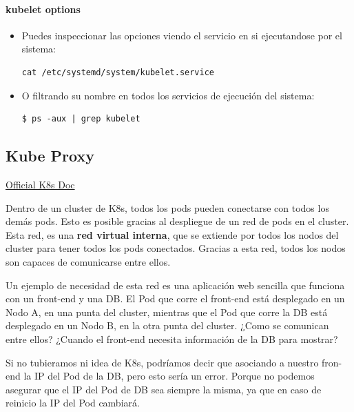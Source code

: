 \documentclass{article}
\newenvironment{codetemplate}[1][]{%
  \mybasecolorbox[#1]
  \itshape
}{%
  \endmybasecolorbox
}
\begin{document}
\paragraph{kubelet options}

\begin{itemize}
    \item Puedes inspeccionar las opciones viendo el servicio en si ejecutandose por el sistema:
\begin{codetemplate}{}
\begin{verbatim}
cat /etc/systemd/system/kubelet.service
\end{verbatim}
\end{codetemplate}

    \item O filtrando su nombre en todos los servicios de ejecución del sistema:
\begin{codetemplate}{}
\begin{verbatim}
$ ps -aux | grep kubelet
\end{verbatim}
\end{codetemplate}
\end{itemize}

\subsection{Kube Proxy}

\href{https://kubernetes.io/docs/reference/command-line-tools-reference/kube-proxy/}{Official K8s Doc}

Dentro de un cluster de K8s, todos los pods pueden conectarse con todos los demás pods. Esto es posible gracias al despliegue de un red de pods en el cluster. Esta red, es una \textbf{red virtual interna}, que se extiende por todos los nodos del cluster para tener todos los pods conectados. Gracias a esta red, todos los nodos son capaces de comunicarse entre ellos.

Un ejemplo de necesidad de esta red es una aplicación web sencilla que funciona con un front-end y una DB. El Pod que corre el front-end está desplegado en un Nodo A, en una punta del cluster, mientras que  el Pod que corre la DB está desplegado en un Nodo B, en la otra punta del cluster. ¿Como se comunican entre ellos? ¿Cuando el front-end necesita información de la DB para mostrar? 

Si no tubieramos ni idea de K8s, podríamos decir que asociando a nuestro fron-end la IP del Pod de la DB, pero esto sería un error. Porque no podemos asegurar que el IP del Pod de DB sea siempre la misma, ya que en caso de reinicio la IP del Pod cambiará.
\end{document}
